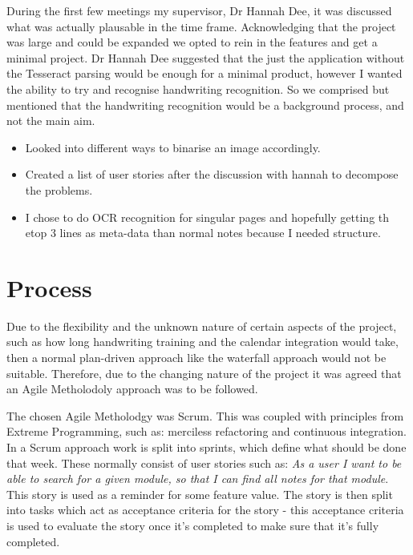 During the first few meetings my supervisor, Dr Hannah Dee, it was discussed what was actually plausable in the time frame. Acknowledging that the project was large and could be expanded we opted to rein in the features and get a minimal project. Dr Hannah Dee suggested that the just the application without the Tesseract parsing would be enough for a minimal product, however I wanted the ability to try and recognise handwriting recognition. So we comprised but mentioned that the handwriting recognition would be a background process, and not the main aim.


\begin{itemize}
  \item Looked into different ways to binarise an image accordingly.
  \item Created a list of user stories after the discussion with hannah to decompose the problems.
  \item I chose to do OCR recognition for singular pages and hopefully getting th etop 3 lines as meta-data than normal notes because I needed structure.
\end{itemize}

\section{Process}
Due to the flexibility and the unknown nature of certain aspects of the project, such as how long handwriting training and the calendar integration would take, then a normal plan-driven approach like the waterfall approach would not be suitable. Therefore, due to the changing nature of the project it was agreed that an Agile Metholodoly approach was to be followed.

The chosen Agile Metholodgy was Scrum. This was coupled with principles from Extreme Programming, such as: merciless refactoring and continuous integration. In a Scrum approach work is split into sprints, which define what should be done that week. These normally consist of user stories such as: \textit{As a user I want to be able to search for a given module, so that I can find all notes for that module}. This story is used as a reminder for some feature value. The story is then split into tasks which act as acceptance criteria for the story - this acceptance criteria is used to evaluate the story once it's completed to make sure that it's fully completed.

